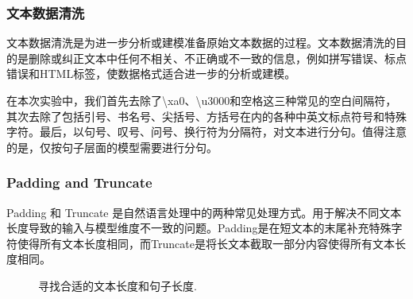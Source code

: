 \documentclass[lang=cn,a4paper]{elegantpaper}
\begin{document}
\subsubsection{文本数据清洗}
文本数据清洗是为进一步分析或建模准备原始文本数据的过程。文本数据清洗的目的是删除或纠正文本中任何不相关、不正确或不一致的信息，例如拼写错误、标点错误和HTML标签，使数据格式适合进一步的分析或建模。

在本次实验中，我们首先去除了\textbackslash xa0、\textbackslash u3000和空格这三种常见的空白间隔符，其次去除了包括引号、书名号、尖括号、方括号在内的各种中英文标点符号和特殊字符。最后，以句号、叹号、问号、换行符为分隔符，对文本进行分句。值得注意的是，仅按句子层面的模型需要进行分句。

\subsubsection{Padding and Truncate}
Padding 和 Truncate 是自然语言处理中的两种常见处理方式。用于解决不同文本长度导致的输入与模型维度不一致的问题。Padding是在短文本的末尾补充特殊字符使得所有文本长度相同，而Truncate是将长文本截取一部分内容使得所有文本长度相同。

\begin{figure}[!htbp]
  \centering
  \hspace{0 pt}
  \caption{寻找合适的文本长度和句子长度.}
  \label{fig:length}
\end{figure}
\end{document}
